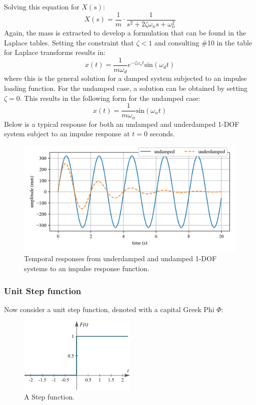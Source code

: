 \documentclass[12pt,letter]{article}
\begin{document}
Solving this equation for $X(s)$:
\begin{equation}
X(s) = \frac{1}{m} \cdot \frac{1}{s^2 + 2 \zeta \omega_n s + \omega_n^2}
\end{equation}
Again, the mass is extracted to develop a formulation that can be found in the Laplace tables. Setting the constraint that $\zeta<1$ and consulting \#10 in the table for Laplace transforms results in:
\begin{equation}
x(t) = \frac{1}{m \omega_d} e^{-\zeta \omega_n t} \text{sin}(\omega_dt)
\label{eq:impulse_load_damped}
\end{equation}
where this is the general solution for a damped system subjected to an impulse loading function. For the undamped case, a solution can be obtained by setting $\zeta=0$. This results in the following form for the undamped case:
\begin{equation}
x(t) = \frac{1}{m \omega_n}\text{sin}(\omega_n t)
\end{equation}
Below is a typical response for both an undamped and underdamped 1-DOF system subject to an impulse response at $t=0$ seconds. 
\begin{figure}[H]
	\centering
	\includegraphics[]{../figures/response_impulse.png}
	\caption{Temporal responses from underdamped and undamped 1-DOF systems to an impulse response function.}
\end{figure}



\subsubsection{Unit Step function}
Now consider a unit step function, denoted with a capital Greek Phi  $\Phi$: 

\begin{figure}[H]
	\centering
	\includegraphics[width=0.5\textwidth]{../figures/unit_step.png}
	\caption{A Step function. }
\end{figure}
\end{document}

